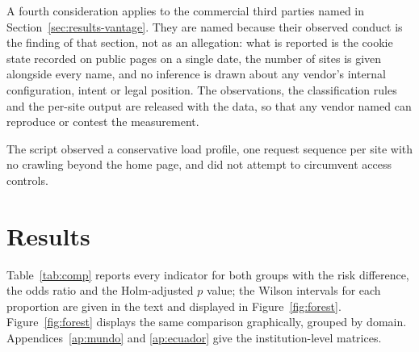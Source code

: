 \documentclass[pdflatex,sn-basic,Numbered,iicol]{sn-jnl}
\theoremstyle{thmstyleone}
\theoremstyle{thmstyletwo}
\theoremstyle{thmstylethree}
\begin{document}
	A fourth consideration applies to the commercial third parties named in Section~\ref{sec:results-vantage}. They are named because their observed conduct is the finding of that section, not as an allegation: what is reported is the cookie state recorded on public pages on a single date, the number of sites is given alongside every name, and no inference is drawn about any vendor's internal configuration, intent or legal position. The observations, the classification rules and the per-site output are released with the data, so that any vendor named can reproduce or contest the measurement.
	
	The script observed a conservative load profile, one request sequence per site with no crawling beyond the home page, and did not attempt to circumvent access controls.
	
	\section{Results}\label{sec:results}
	
	Table~\ref{tab:comp} reports every indicator for both groups with the risk difference, the odds ratio and the Holm-adjusted $p$ value; the Wilson intervals for each proportion are given in the text and displayed in Figure~\ref{fig:forest}. Figure~\ref{fig:forest} displays the same comparison graphically, grouped by domain. Appendices~\ref{ap:mundo} and \ref{ap:ecuador} give the institution-level matrices.
	
\end{document}
